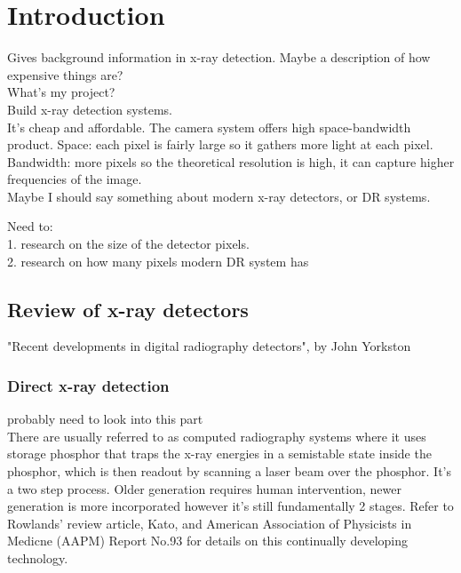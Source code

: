 \chapter{Introduction}
Gives background information in x-ray detection. Maybe a description of how expensive things are? \\
What's my project?\\
	Build x-ray detection systems.\\
	It's cheap and affordable.  The camera system offers high space-bandwidth product.  Space: each pixel is fairly large so it gathers more light at each pixel. Bandwidth: more pixels so the theoretical resolution is high, it can capture higher frequencies of the image.\\
	Maybe I should say something about modern x-ray detectors, or DR systems.
	
	
Need to:\\
	1. research on the size of the detector pixels.\\
	2. research on how many pixels modern DR system has\\


\section{Review of x-ray detectors}
	"Recent developments in digital radiography detectors", by John Yorkston\\
	
\subsection{Direct x-ray detection}
	probably need to look into this part~\citep{Kim2008}\\
	There are usually referred to as computed radiography systems where it uses storage phosphor that traps the x-ray energies in a semistable state inside the phosphor, which is then readout by scanning a laser beam over the phosphor.  It's a two step process.  Older generation requires human intervention, newer generation is more incorporated however it's still fundamentally 2 stages.  Refer to Rowlands' review article, Kato, and American Association of Physicists in Medicne (AAPM) Report No.93 for details on this continually developing technology.
	
